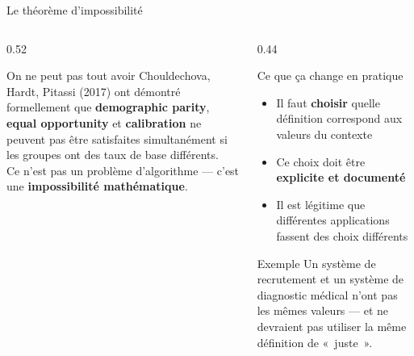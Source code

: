 \documentclass[aspectratio=169, 10pt]{beamer}
\begin{document}
\begin{frame}{Le théorème d'impossibilité}
  \begin{columns}[T]
    \begin{column}{0.52\textwidth}
      \begin{alertblock}{On ne peut pas tout avoir}
        Chouldechova, Hardt, Pitassi (2017) ont démontré
        formellement que \textbf{demographic parity},
        \textbf{equal opportunity} et \textbf{calibration}
        ne peuvent pas être satisfaites simultanément
        si les groupes ont des taux de base différents.\\[4pt]
        Ce n'est pas un problème d'algorithme —
        c'est une \textbf{impossibilité mathématique}.
      \end{alertblock}
    \end{column}
    \begin{column}{0.44\textwidth}
      \begin{block}{Ce que ça change en pratique}
        \begin{itemize}
          \item Il faut \textbf{choisir} quelle définition
                correspond aux valeurs du contexte
          \item Ce choix doit être \textbf{explicite
                et documenté}
          \item Il est légitime que différentes
                applications fassent des choix différents
        \end{itemize}
      \end{block}
      \smallskip
      \begin{exampleblock}{Exemple}
        Un système de recrutement et un système
        de diagnostic médical n'ont pas les mêmes
        valeurs — et ne devraient pas utiliser
        la même définition de «~juste~».
      \end{exampleblock}
    \end{column}
  \end{columns}
\end{frame}
\end{document}
